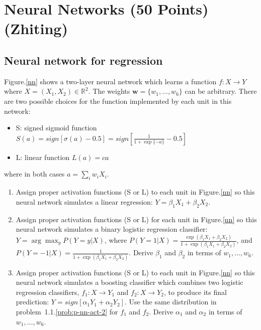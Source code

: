
\section{Neural Networks (50 Points) (Zhiting)}

\subsection{Neural network for regression}

Figure.\ref{nn} shows a two-layer neural network which learns a function $f:X\to Y$ where $X=(X_1, X_2) \in \mathbb{R}^2$. The weights $\bm{w} = \{w_1, \dots, w_6\}$ can be arbitrary. There are two possible choices for the function implemented by each unit in this network:
    \begin{itemize}
    \item S: signed sigmoid function $S(a) = sign[\sigma(a) - 0.5] = sign[\frac{1}{1+\exp\{-a\}}-0.5]$
    \item L: linear function $L(a) = ca$
    \end{itemize}
    where in both cases $a = \sum_i w_i X_i$.
    \begin{enumerate}
    \item Assign proper activation functions (S or L) to each unit in Figure.\ref{nn} so this neural network simulates a linear regression: $Y=\beta_1 X_1 + \beta_2 X_2$.
    \item Assign proper activation functions (S or L) for each unit in Figure.\ref{nn} so this neural network simulates a binary logistic regression classifier: $Y=\arg\max_{y}P(Y=y|X)$, where $P(Y=1|X) = \frac{\exp(\beta_1X_1+\beta_2X_2)}{1+\exp(\beta_1X_1+\beta_2X_2)}$, and $P(Y=-1|X) = \frac{1}{1+\exp(\beta_1X_1+\beta_2X_2)}$. Derive $\beta_1$ and $\beta_2$ in terms of $w_1,\dots,w_6$. \label{prob:p-nn-act-2}
    \item Assign proper activation functions (S or L) to each unit in Figure.\ref{nn} so this neural network simulates a boosting classifier which combines two logistic regression classifiers, $f_1: X\to Y_1$ and $f_2: X\to Y_2$, to produce its final prediction: $Y=sign[\alpha_1Y_1 + \alpha_2 Y_2]$. Use the same distribution in problem~1.1.\ref{prob:p-nn-act-2} for $f_1$ and $f_2$. Derive $\alpha_1$ and $\alpha_2$ in terms of $w_1,\dots,w_6$.
    \end{enumerate}

